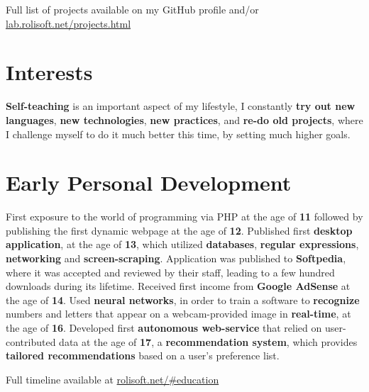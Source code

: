 \documentclass[11pt,a4paper,sans]{moderncv}
\renewcommand*{\httplink}[2][]{%
	\ifthenelse{\equal{#1}{}}%
	{\href{https://#2}{#2}}%
	{\href{https://#2}{#1}}}
\begin{document}
	{\small Full list of projects available on my GitHub profile and/or \httplink{lab.rolisoft.net/projects.html}}

\section{Interests}

	{\small \textbf{Self-teaching} is an important aspect of my lifestyle, I constantly \textbf{try out new languages}, \textbf{new technologies}, \textbf{new practices}, and \textbf{re-do old projects}, where I challenge myself to do it much better this time, by setting much higher goals.}

\section{Early Personal Development}

	{\small First exposure to the world of programming via PHP at the age of \textbf{11} followed by publishing the first dynamic webpage at the age of \textbf{12}. Published first \textbf{desktop application}, at the age of \textbf{13}, which utilized \textbf{databases}, \textbf{regular expressions}, \textbf{networking} and \textbf{screen-scraping}. Application was published to \textbf{Softpedia}, where it was accepted and reviewed by their staff, leading to a few hundred downloads during its lifetime. Received first income from \textbf{Google AdSense} at the age of \textbf{14}. Used \textbf{neural networks}, in order to train a software to \textbf{recognize} numbers and letters that appear on a webcam-provided image in \textbf{real-time}, at the age of \textbf{16}. Developed first \textbf{autonomous web-service} that relied on user-contributed data at the age of \textbf{17}, a \textbf{recommendation system}, which provides \textbf{tailored recommendations} based on a user's preference list.

	\vspace{6pt}

	Full timeline available at \httplink{rolisoft.net/\#education}}
\end{document}
